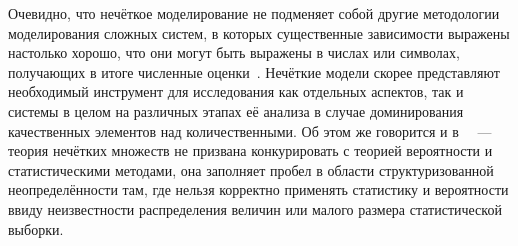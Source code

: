 Очевидно, что нечёткое моделирование не подменяет собой другие методологии моделирования сложных систем, в которых существенные зависимости выражены настолько хорошо, что они могут быть выражены в числах или символах, получающих в итоге численные оценки~\cite{Borisov_Fedulov}. Нечёткие модели скорее представляют необходимый инструмент для исследования как отдельных аспектов, так и системы в целом на различных этапах её анализа в случае доминирования качественных элементов над количественными. Об этом же говорится и в~\cite{Kaufmann, Borisov_Alexeev_Msk} ~--- теория нечётких множеств не призвана конкурировать с теорией вероятности и статистическими методами, она заполняет пробел в области структуризованной неопределённости там, где нельзя корректно применять статистику и вероятности ввиду неизвестности распределения величин или малого размера статистической выборки.


